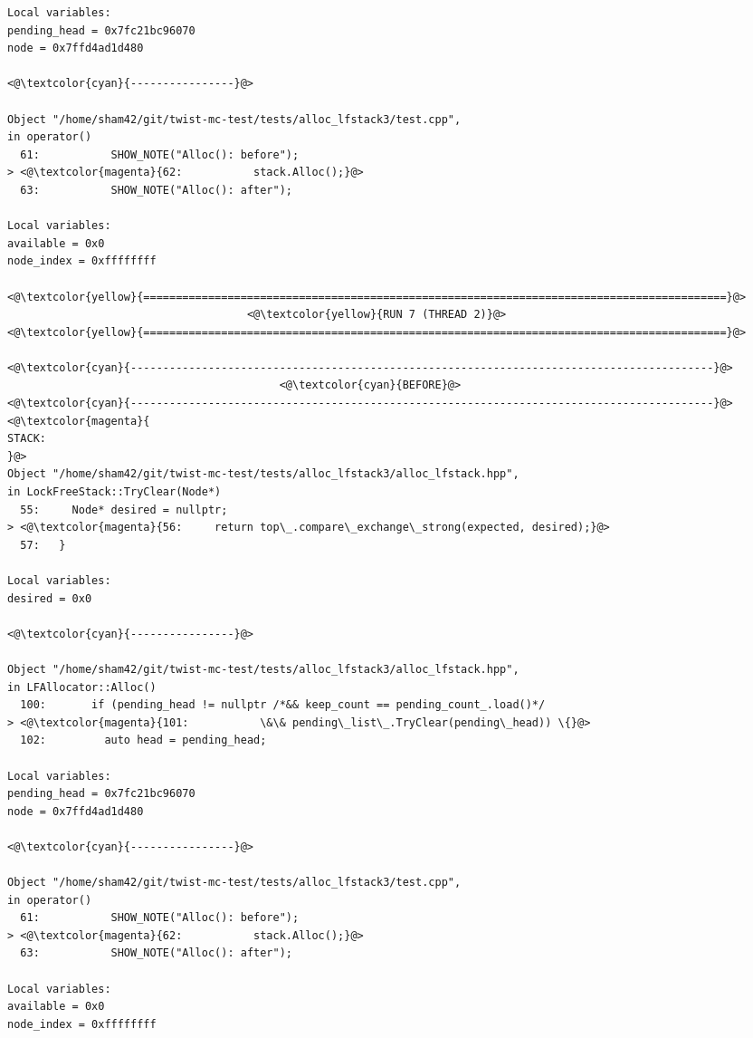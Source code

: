 \begin{adjustwidth}{-3.3cm}{-1cm}
\begin{allintypewriter}
\begin{multicols*}{2}
\begin{lstlisting}[numbers=none]
Local variables: 
pending_head = 0x7fc21bc96070
node = 0x7ffd4ad1d480

<@\textcolor{cyan}{----------------}@>

Object "/home/sham42/git/twist-mc-test/tests/alloc_lfstack3/test.cpp",
in operator()
  61:           SHOW_NOTE("Alloc(): before");
> <@\textcolor{magenta}{62:           stack.Alloc();}@>
  63:           SHOW_NOTE("Alloc(): after");

Local variables: 
available = 0x0
node_index = 0xffffffff

<@\textcolor{yellow}{==========================================================================================}@>
                                     <@\textcolor{yellow}{RUN 7 (THREAD 2)}@>
<@\textcolor{yellow}{==========================================================================================}@>

<@\textcolor{cyan}{------------------------------------------------------------------------------------------}@>
                                          <@\textcolor{cyan}{BEFORE}@>
<@\textcolor{cyan}{------------------------------------------------------------------------------------------}@>
<@\textcolor{magenta}{
STACK:
}@>
Object "/home/sham42/git/twist-mc-test/tests/alloc_lfstack3/alloc_lfstack.hpp",
in LockFreeStack::TryClear(Node*)
  55:     Node* desired = nullptr;
> <@\textcolor{magenta}{56:     return top\_.compare\_exchange\_strong(expected, desired);}@>
  57:   }

Local variables: 
desired = 0x0

<@\textcolor{cyan}{----------------}@>

Object "/home/sham42/git/twist-mc-test/tests/alloc_lfstack3/alloc_lfstack.hpp",
in LFAllocator::Alloc()
  100:       if (pending_head != nullptr /*&& keep_count == pending_count_.load()*/
> <@\textcolor{magenta}{101:           \&\& pending\_list\_.TryClear(pending\_head)) \{}@>
  102:         auto head = pending_head;

Local variables: 
pending_head = 0x7fc21bc96070
node = 0x7ffd4ad1d480

<@\textcolor{cyan}{----------------}@>

Object "/home/sham42/git/twist-mc-test/tests/alloc_lfstack3/test.cpp",
in operator()
  61:           SHOW_NOTE("Alloc(): before");
> <@\textcolor{magenta}{62:           stack.Alloc();}@>
  63:           SHOW_NOTE("Alloc(): after");

Local variables: 
available = 0x0
node_index = 0xffffffff


\end{lstlisting}
\end{multicols*}
\end{allintypewriter}
\end{adjustwidth}
